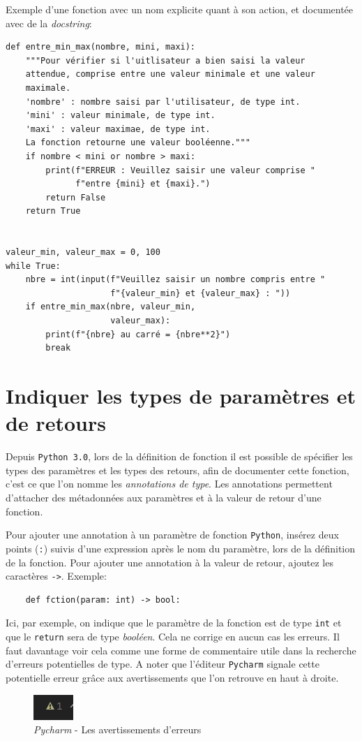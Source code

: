 \documentclass[a4paper,12pt]{book}
\begin{document}
Exemple d'une fonction avec un nom explicite quant à son action, et documentée avec de la \textit{docstring}:
\begin{lstlisting}[caption=Exemple d'une fonction avec une \textit{docstring}]
def entre_min_max(nombre, mini, maxi):
    """Pour vérifier si l'uitlisateur a bien saisi la valeur 
    attendue, comprise entre une valeur minimale et une valeur 
    maximale.
    'nombre' : nombre saisi par l'utilisateur, de type int.
    'mini' : valeur minimale, de type int.
    'maxi' : valeur maximae, de type int.
    La fonction retourne une valeur booléenne."""
    if nombre < mini or nombre > maxi:
        print(f"ERREUR : Veuillez saisir une valeur comprise "
              f"entre {mini} et {maxi}.")
        return False
    return True


valeur_min, valeur_max = 0, 100
while True:
    nbre = int(input(f"Veuillez saisir un nombre compris entre "
                     f"{valeur_min} et {valeur_max} : "))
    if entre_min_max(nbre, valeur_min,
                     valeur_max):
        print(f"{nbre} au carré = {nbre**2}")
        break
\end{lstlisting}
\medskip

\section{Indiquer les types de paramètres et de retours}\label{annotation_types}
Depuis \texttt{Python 3.0}, lors de la définition de fonction il est possible de spécifier les types des paramètres et les types des retours, afin de documenter cette fonction, c'est ce que l'on nomme les \textit{annotations de type}. Les annotations permettent d'attacher des métadonnées aux paramètres et à la valeur de retour d'une fonction.
\medskip

Pour ajouter une annotation à un paramètre de fonction \texttt{Python}, insérez deux points (\texttt{:}) suivis d'une expression après le nom du paramètre, lors de la définition de la fonction. Pour ajouter une annotation à la valeur de retour, ajoutez les caractères \og \texttt{->}\fg{}. Exemple:
\begin{verbatim}
    def fction(param: int) -> bool:
\end{verbatim}
\medskip

Ici, par exemple, on indique que le paramètre de la fonction est de type \texttt{int} et que le \texttt{return} sera de type \textit{booléen}. Cela ne corrige en aucun cas les erreurs. Il faut davantage voir cela comme une forme de commentaire utile dans la recherche d'erreurs potentielles de type. A noter que l'éditeur \texttt{Pycharm} signale cette potentielle erreur grâce aux avertissements que l'on retrouve en haut à droite.
\begin{figure}[h]
\begin{center}
\includegraphics[scale=0.6]{IMG/Pycharm-11.png}
\caption{\textit{Pycharm} - Les avertissements d'erreurs}
\end{center}
\end{figure}
\medskip
\end{document}
